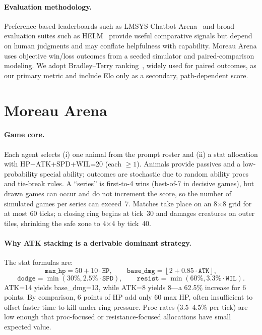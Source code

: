 \documentclass[11pt]{article}
\begin{document}
\paragraph{Evaluation methodology.}
Preference-based leaderboards such as LMSYS Chatbot Arena~\cite{chatbot_arena} and broad evaluation suites such as HELM~\cite{helm} provide useful comparative signals but depend on human judgments and may conflate helpfulness with capability.
Moreau Arena uses objective win/loss outcomes from a seeded simulator and paired-comparison modeling.
We adopt Bradley--Terry ranking~\cite{bradley_terry}, widely used for paired outcomes, as our primary metric and include Elo only as a secondary, path-dependent score.

\section{Moreau Arena}

\paragraph{Game core.}
Each agent selects (i) one animal from the prompt roster and (ii) a stat allocation with HP+ATK+SPD+WIL=20 (each $\ge 1$).
Animals provide passives and a low-probability special ability; outcomes are stochastic due to random ability procs and tie-break rules.
A ``series'' is first-to-4 wins (best-of-7 in decisive games), but drawn games can occur and do not increment the score, so the number of simulated games per series can exceed~7.
Matches take place on an 8$\times$8 grid for at most 60 ticks; a closing ring begins at tick~30 and damages creatures on outer tiles, shrinking the safe zone to 4$\times$4 by tick~40.

\paragraph{Why ATK stacking is a derivable dominant strategy.}
The stat formulas are:
\[
\texttt{max\_hp} = 50 + 10\cdot \texttt{HP},\qquad
\texttt{base\_dmg} = \left\lfloor 2 + 0.85\cdot \texttt{ATK}\right\rfloor,
\]
\[
\texttt{dodge} = \min(30\%, 2.5\%\cdot \texttt{SPD}),\qquad
\texttt{resist} = \min(60\%, 3.3\%\cdot \texttt{WIL}).
\]
ATK=14 yields base\_dmg=13, while ATK=8 yields 8---a 62.5\% increase for 6 points.
By comparison, 6 points of HP add only 60 max HP, often insufficient to offset faster time-to-kill under ring pressure.
Proc rates (3.5--4.5\% per tick) are low enough that proc-focused or resistance-focused allocations have small expected value.
\end{document}
